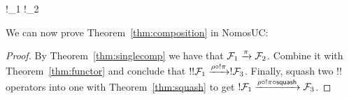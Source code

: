 \begin{theorem}\label{thm:functor}
	\begin{mathpar}
		{
			!\F_1 \xrightarrow{!\pi} !\F_2
		}
	\end{mathpar}
\end{theorem}

We can now prove Theorem~\ref{thm:composition} in NomosUC:
\begin{proof}
By Theorem~\ref{thm:singlecomp} we have that $\mathcal{F}_1 \xrightarrow{\pi} \mathcal{F}_2$. Combine it with Theorem~\ref{thm:functor} and conclude that $!!\mathcal{F}_1 \xrightarrow{\rho \circ !\pi} !\mathcal{F}_3$. 
Finally, squash two $!!$ operators into one with Theorem~\ref{thm:squash} to get $!\mathcal{F}_1 \xrightarrow{\rho \circ !\pi \circ \mathsf{squash}} \mathcal{F}_3$.
\end{proof}

